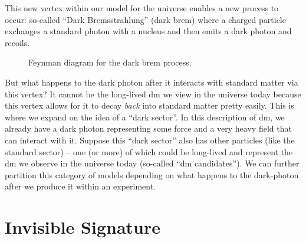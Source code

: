 This new vertex within our model for the universe enables a new process to occur: so-called
``Dark Bremsstrahlung'' (dark brem) where a charged particle exchanges a standard photon with
a nucleus and then emits a dark photon and recoils.

\begin{figure}
    \centering
    \caption{
        Feynman diagram for the dark brem process.
    }
    \label{fig:dark-brem-feynman}
\end{figure}

But what happens to the dark photon after it interacts with standard matter via this vertex?
It cannot be the long-lived \gls{dm} we view in the universe today because this vertex allows for
it to decay \emph{back} into standard matter pretty easily. This is where we expand on the idea of
a ``dark sector''. In this description of \gls{dm}, we already have a dark photon representing some
force and a very heavy field that can interact with it. Suppose this ``dark sector'' also has other
particles (like the standard sector) -- one (or more) of which could be long-lived and represent
the \gls{dm} we observe in the universe today (so-called ``\gls{dm} candidates''). We can further
partition this category of models depending on what happens to the \gls{dark-photon} after we produce
it within an experiment.

\section{Invisible Signature}


